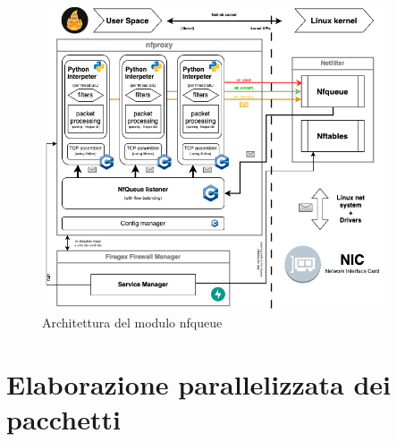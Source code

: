 \begin{figure}[H]
    \centering
    \includegraphics[width=0.9\textwidth]{images/chapter3/nfproxy.drawio.png}
    \caption{Architettura del modulo nfqueue}
    \label{fig:firegex_nfproxy_arch}
\end{figure}

\section{Elaborazione parallelizzata dei pacchetti}

